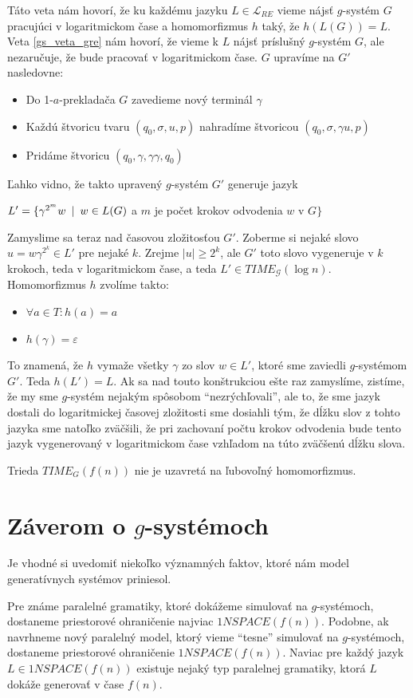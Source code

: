 \begin{dokaz}
Táto veta nám hovorí, že ku každému jazyku $L\in\mathcal{L}_{RE}$
vieme nájsť $g$-systém $G$ pracujúci v logaritmickom čase a
homomorfizmus $h$ taký, že $h(L(G))=L$. Veta \ref{gs_veta_gre} nám
hovorí, že vieme k $L$ nájsť príslušný $g$-systém $G$, ale
nezaručuje, že bude pracovať v logaritmickom čase. $G$ upravíme na
$G'$ nasledovne:
\begin{itemize}
\item Do 1-$a$-prekladača $G$ zavedieme nový terminál $\gamma$
\item Každú štvoricu tvaru $(q_0,\sigma ,u,p)$ nahradíme štvoricou $(q_0,\sigma ,\gamma u,p)$
\item Pridáme štvoricu $(q_0,\gamma,\gamma\gamma,q_0)$
\end{itemize}
Ľahko vidno, že takto upravený $g$-systém $G'$ generuje jazyk

\centerline{$L'=\{\gamma^{2^m} w\enspace |\enspace w\in L(G)$ a $m$ je počet
krokov odvodenia $w$ v $G\}$} Zamyslime sa teraz nad časovou
zložitosťou $G'$. Zoberme si nejaké slovo $u=w{\gamma}^{2^k}\in
L'$ pre nejaké $k$. Zrejme $|u|\geq 2^k$, ale $G'$ toto slovo
vygeneruje v $k$ krokoch, teda v logaritmickom čase, a teda $L'\in
TIME_{\mathcal{G}}(\log n)$. Homomorfizmus $h$ zvolíme takto:
\begin{itemize}
\item $\forall a\in T: h(a)=a$
\item $h(\gamma)=\varepsilon$
\end{itemize}
To znamená, že $h$ vymaže všetky $\gamma$ zo slov $w\in L'$, ktoré
sme zaviedli $g$-systémom $G'$. Teda $h(L')=L$. Ak sa nad touto
konštrukciou ešte raz zamyslíme, zistíme, že my sme $g$-systém
nejakým spôsobom ``nezrýchľovali'', ale to, že sme jazyk dostali
do logaritmickej časovej zložitosti sme dosiahli tým, že dĺžku
slov z tohto jazyka sme natoľko zväčšili, že pri zachovaní počtu
krokov odvodenia bude tento jazyk vygenerovaný v logaritmickom
čase vzhľadom na túto zväčšenú dĺžku slova.
\end{dokaz}

\begin{dosledok}
Trieda $TIME_{G}(f(n))$ nie je uzavretá na ľubovoľný
homomorfizmus.
\end{dosledok}

\section{Záverom o $g$-systémoch}

Je vhodné si uvedomiť niekoľko významných faktov, ktoré nám model
generatívnych systémov priniesol.

Pre známe paralelné gramatiky, ktoré dokážeme simulovať na
$g$-systémoch, dostaneme priestorové ohraničenie najviac
$1NSPACE(f(n))$. Podobne, ak navrhneme nový paralelný model, ktorý
vieme ``tesne'' simulovať na $g$-systémoch, dostaneme priestorové
ohraničenie $1NSPACE(f(n))$. Naviac pre každý jazyk $L\in
1NSPACE(f(n))$ existuje nejaký typ paralelnej gramatiky, ktorá $L$
dokáže generovať v čase $f(n)$.
